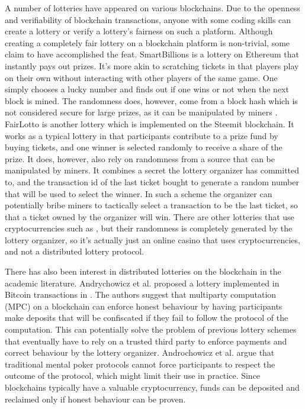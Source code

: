 A number of lotteries have appeared on various blockchains. Due to the openness and verifiability of blockchain transactions, anyone with some coding skills can create a lottery or verify a lottery's fairness on such a platform. Although creating a completely fair lottery on a blockchain platform is non-trivial, some claim to have accomplished the feat. SmartBillions \cite{noauthor_smartbillions_nodate} is a lottery on Ethereum that instantly pays out prizes. It's more akin to scratching tickets in that players play on their own without interacting with other players of the same game. One simply chooses a lucky number and finds out if one wins or not when the next block is mined. The randomness does, however, come from a block hash which is not considered secure for large prizes, as it can be manipulated by miners \cite{bonneau_bitcoin_2015, pierrot_malleability_2018}. 
FairLotto \cite{ago_fairlotto_2018} is another lottery which is implemented on the Steemit blockchain. It works as a typical lottery in that participants contribute to a prize fund by buying tickets, and one winner is selected randomly to receive a share of the prize. It does, however, also rely on randomness from a source that can be manipulated by miners. It combines a secret the lottery organizer has committed to, and the transaction id of the last ticket bought to generate a random number that will be used to select the winner. In such a scheme the organizer can potentially bribe miners to tactically select a transaction to be the last ticket, so that a ticket owned by the organizer will win. 
There are other lotteries that use cryptocurrencies such as \cite{noauthor_satoshi_nodate}, but their randomness is completely generated by the lottery organizer, so it's actually just an online casino that uses cryptocurrencies, and not a distributed lottery protocol.

There has also been interest in distributed lotteries on the blockchain in the academic literature. Andrychowicz et al. proposed a lottery implemented in Bitcoin transactions in \cite{andrychowicz_secure_2014}. The authors suggest that multiparty computation (MPC) on a blockchain can enforce honest behaviour by having participants make deposits that will be confiscated if they fail to follow the protocol of the computation. This can potentially solve the problem of previous lottery schemes that eventually have to rely on a trusted third party to enforce payments and correct behaviour by the lottery organizer. Androchowicz et al. argue that traditional mental poker protocols cannot force participants to respect the outcome of the protocol, which might limit their use in practice. Since blockchains typically have a valuable cryptocurrency, funds can be deposited and reclaimed only if honest behaviour can be proven.


